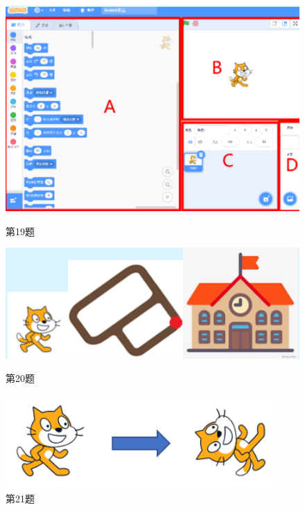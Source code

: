 \documentclass[10pt, a4paper]{article}
\begin{document}
\begin{enumerate}
        \begin{figure}[htbp]
            \centering
            \begin{minipage}[t]{.15\textwidth}
                \centering
                \includegraphics[width=\textwidth]{19.png}
                \caption*{第19题}
            \end{minipage}
            \begin{minipage}[t]{.23\textwidth}
                \centering
                \includegraphics[width=\textwidth]{20.png}
                \caption*{第20题}
            \end{minipage}
            \begin{minipage}[t]{.27\textwidth}
                \centering
                \includegraphics[width=\textwidth]{21.png}
                \caption*{第21题}
            \end{minipage}
        \end{figure}


\end{enumerate}
\end{document}

